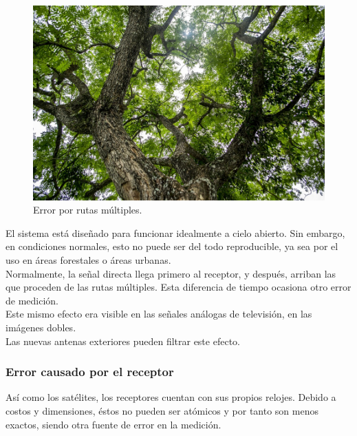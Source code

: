 \begin{figure}[!ht]
\centering
\includegraphics[scale=0.28]{Figures/RutasMult2}
\caption[Error por rutas múltiples.]{Error por rutas múltiples\footnotemark.}
\label{fig:ErrRMul}
\end{figure}


 El sistema está diseñado para funcionar idealmente a cielo abierto. Sin embargo, en condiciones normales, esto no puede ser del todo reproducible, ya sea por el uso en áreas forestales o áreas urbanas. \\
 
Normalmente, la señal directa llega primero al receptor, y después, arriban las que proceden de las rutas múltiples. Esta diferencia de tiempo ocasiona otro error de medición. \\

Este mismo efecto era visible en las señales análogas de televisión, en las imágenes dobles. \\

Las nuevas antenas exteriores pueden filtrar este efecto.

\subsubsection{Error causado por el receptor}

Así como los satélites, los receptores cuentan con sus propios relojes. Debido a costos y dimensiones, éstos no pueden ser atómicos y por tanto son menos exactos, siendo otra fuente de error en la medición.\\

